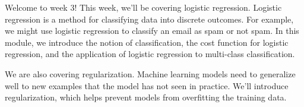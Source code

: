 Welcome to week 3! This week, we’ll be covering logistic regression. Logistic regression is a method for classifying data into discrete outcomes. For example, we might use logistic regression to classify an email as spam or not spam. In this module, we introduce the notion of classification, the cost function for logistic regression, and the application of logistic regression to multi-class classification.

We are also covering regularization. Machine learning models need to generalize well to new examples that the model has not seen in practice. We’ll introduce regularization, which helps prevent models from overfitting the training data. 
